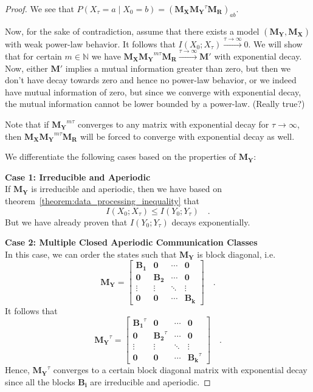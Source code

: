 \documentclass[../../main.tex]{subfiles}
\begin{document}
\begin{proof}
        We see that $P(X_{\tau} = a \mid X_0 = b) = (\bm{M_X} \bm{M_Y}^\tau \bm{M_R})_{ab}$.

        Now, for the sake of contradiction, assume that there exists a model $(\bm{M_Y}, \bm{M_X})$ with weak power-law behavior. It follows that $I(X_0; X_{\tau}) \xrightarrow{\tau \to \infty} 0$. We will show that for certain $m \in \mathbb{N}$ we have $\bm{M_X} \bm{M_Y}^{m \tau} \bm{M_R} \xrightarrow{\tau \to \infty} \bm{M'}$ with exponential decay. Now, either $\bm{M'}$ implies a mutual information greater than zero, but then we don't have decay towards zero and hence no power-law behavior, or we indeed have mutual information of zero, but since we converge with exponential decay, the mutual information cannot be lower bounded by a power-law. (Really true?)
        
        Note that if $\bm{M_Y}^{m \tau}$ converges to any matrix with exponential decay for $\tau \to \infty$, then $\bm{M_X} \bm{M_Y}^{m \tau} \bm{M_R}$ will be forced to converge with exponential decay as well.
        
        We differentiate the following cases based on the properties of $\bm{M_Y}$:

        \textbf{Case 1: Irreducible and Aperiodic} \\
        If $\bm{M_Y}$ is irreducible and aperiodic, then we have based on theorem~\ref{theorem:data_processing_inequality} that
        \[
            I(X_0; X_\tau) \leq I(Y_0; Y_\tau) \quad .
        \]
        But we have already proven that $I(Y_0; Y_\tau)$ decays exponentially.

        \textbf{Case 2: Multiple Closed Aperiodic Communication Classes} \\
        In this case, we can order the states such that $\bm{M_Y}$ is block diagonal, i.e.
        \[
            \bm{M_Y} = 
            \begin{bmatrix}
            \bm{B_1} & \bm{0} & \cdots & \bm{0} \\
            \bm{0} & \bm{B_2} & \cdots & \bm{0} \\
            \vdots & \vdots & \ddots & \vdots \\
            \bm{0} & \bm{0} & \cdots & \bm{B_k}
            \end{bmatrix}
            \quad .
        \]
        It follows that
        \[
            \bm{M_Y}^\tau = 
            \begin{bmatrix}
            \bm{B_1}^\tau & \bm{0} & \cdots & \bm{0} \\
            \bm{0} & \bm{B_2}^\tau & \cdots & \bm{0} \\
            \vdots & \vdots & \ddots & \vdots \\
            \bm{0} & \bm{0} & \cdots & \bm{B_k}^\tau
            \end{bmatrix}
            \quad .
        \]
        Hence, $\bm{M_Y}^\tau$ converges to a certain block diagonal matrix with exponential decay since all the blocks $\bm{B_i}$ are irreducible and aperiodic.


\end{proof}
\end{document}

